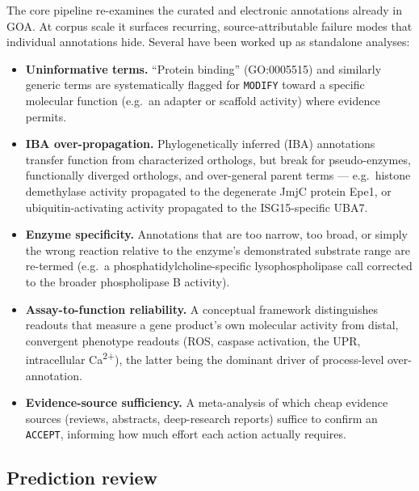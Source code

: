 \documentclass[11pt]{article}
\providecommand{\tightlist}{%
  \setlength{\itemsep}{0pt}\setlength{\parskip}{0pt}}
\newcommand{\code}[1]{\texttt{#1}}
\begin{document}
The core pipeline re-examines the curated and electronic annotations already in
GOA. At corpus scale it surfaces recurring, source-attributable failure modes that
individual annotations hide. Several have been worked up as standalone analyses:

\begin{itemize}
\tightlist
\item \textbf{Uninformative terms.} ``Protein binding'' (GO:0005515) and similarly
generic terms are systematically flagged for \code{MODIFY} toward a specific
molecular function (e.g.\ an adapter or scaffold activity) where evidence permits.
\item \textbf{IBA over-propagation.} Phylogenetically inferred (IBA) annotations
transfer function from characterized orthologs, but break for pseudo-enzymes,
functionally diverged orthologs, and over-general parent terms --- e.g.\ histone
demethylase activity propagated to the degenerate JmjC protein Epe1, or
ubiquitin-activating activity propagated to the ISG15-specific UBA7.
\item \textbf{Enzyme specificity.} Annotations that are too narrow, too broad, or
simply the wrong reaction relative to the enzyme's demonstrated substrate range are
re-termed (e.g.\ a phosphatidylcholine-specific lysophospholipase call corrected to
the broader phospholipase B activity).
\item \textbf{Assay-to-function reliability.} A conceptual framework distinguishes
readouts that measure a gene product's own molecular activity from distal,
convergent phenotype readouts (ROS, caspase activation, the UPR, intracellular
Ca\textsuperscript{2+}), the latter being the dominant driver of process-level
over-annotation.
\item \textbf{Evidence-source sufficiency.} A meta-analysis of which cheap evidence
sources (reviews, abstracts, deep-research reports) suffice to confirm an
\code{ACCEPT}, informing how much effort each action actually requires.
\end{itemize}

\subsection{Prediction review}
\end{document}
